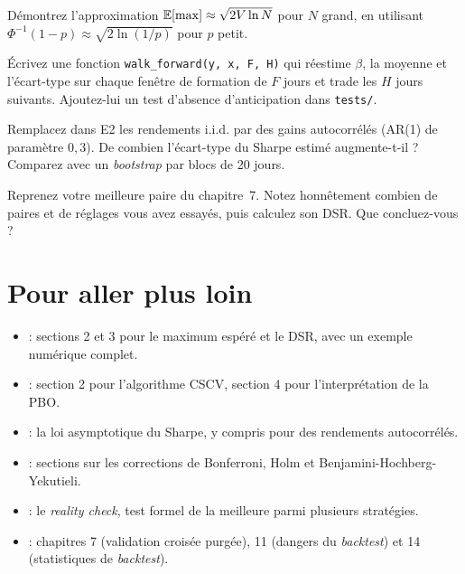 \begin{exercise}
Démontrez l'approximation $\mathbb{E}[\max]\approx\sqrt{2V\ln N}$ pour $N$ grand, en utilisant $\Phi^{-1}(1-p)\approx\sqrt{2\ln(1/p)}$ pour $p$ petit.
\end{exercise}

\begin{exercise}[à coder]
Écrivez une fonction \texttt{walk\_forward(y, x, F, H)} qui réestime $\beta$, la moyenne et l'écart-type sur chaque fenêtre de formation de $F$ jours et trade les $H$ jours suivants. Ajoutez-lui un test d'absence d'anticipation dans \texttt{tests/}.
\end{exercise}

\begin{exercise}[à coder]
Remplacez dans E2 les rendements i.i.d. par des gains autocorrélés (AR(1) de paramètre $0{,}3$). De combien l'écart-type du Sharpe estimé augmente-t-il ? Comparez avec un \emph{bootstrap} par blocs de 20 jours.
\end{exercise}

\begin{exercise}
Reprenez votre meilleure paire du chapitre~7. Notez honnêtement combien de paires et de réglages vous avez essayés, puis calculez son DSR. Que concluez-vous ?
\end{exercise}

\section{Pour aller plus loin}

\begin{toread}
\begin{itemize}[leftmargin=1.2em]
\item \citet{bailey2014dsr} : sections 2 et 3 pour le maximum espéré et le DSR, avec un exemple numérique complet.
\item \citet{bailey2017pbo} : section 2 pour l'algorithme CSCV, section 4 pour l'interprétation de la PBO.
\item \citet{lo2002} : la loi asymptotique du Sharpe, y compris pour des rendements autocorrélés.
\item \citet{harvey2016} : sections sur les corrections de Bonferroni, Holm et Benjamini-Hochberg-Yekutieli.
\item \citet{white2000} : le \emph{reality check}, test formel de la meilleure parmi plusieurs stratégies.
\item \citet{lopezdeprado2018} : chapitres 7 (validation croisée purgée), 11 (dangers du \emph{backtest}) et 14 (statistiques de \emph{backtest}).
\end{itemize}
\end{toread}

